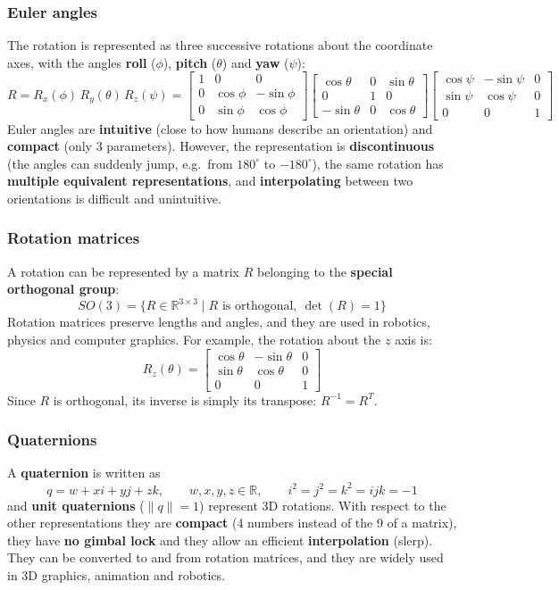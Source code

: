 \subsubsection{Euler angles}
The rotation is represented as three successive rotations about the coordinate axes, with the angles \textbf{roll} ($\phi$), \textbf{pitch} ($\theta$) and \textbf{yaw} ($\psi$):
\[
R = R_x(\phi)\,R_y(\theta)\,R_z(\psi) =
\begin{bmatrix} 1 & 0 & 0 \\ 0 & \cos\phi & -\sin\phi \\ 0 & \sin\phi & \cos\phi \end{bmatrix}
\begin{bmatrix} \cos\theta & 0 & \sin\theta \\ 0 & 1 & 0 \\ -\sin\theta & 0 & \cos\theta \end{bmatrix}
\begin{bmatrix} \cos\psi & -\sin\psi & 0 \\ \sin\psi & \cos\psi & 0 \\ 0 & 0 & 1 \end{bmatrix}
\]
Euler angles are \textbf{intuitive} (close to how humans describe an orientation) and \textbf{compact} (only 3 parameters).
However, the representation is \textbf{discontinuous} (the angles can suddenly jump, e.g.\ from $180^\circ$ to $-180^\circ$), the same rotation has \textbf{multiple equivalent representations}, and \textbf{interpolating} between two orientations is difficult and unintuitive.

\subsubsection{Rotation matrices}
A rotation can be represented by a matrix $R$ belonging to the \textbf{special orthogonal group}:
\[
SO(3) = \{ R \in \mathbb{R}^{3\times3} \mid R \text{ is orthogonal},\ \det(R) = 1 \}
\]
Rotation matrices preserve lengths and angles, and they are used in robotics, physics and computer graphics.
For example, the rotation about the $z$ axis is:
\[
R_z(\theta) = \begin{bmatrix} \cos\theta & -\sin\theta & 0 \\ \sin\theta & \cos\theta & 0 \\ 0 & 0 & 1 \end{bmatrix}
\]
Since $R$ is orthogonal, its inverse is simply its transpose: $R^{-1} = R^T$.

\subsubsection{Quaternions}
A \textbf{quaternion} is written as
\[
q = w + xi + yj + zk, \qquad w, x, y, z \in \mathbb{R}, \qquad i^2 = j^2 = k^2 = ijk = -1
\]
and \textbf{unit quaternions} ($\|q\| = 1$) represent 3D rotations.
With respect to the other representations they are \textbf{compact} (4 numbers instead of the 9 of a matrix), they have \textbf{no gimbal lock} and they allow an efficient \textbf{interpolation} (slerp). They can be converted to and from rotation matrices, and they are widely used in 3D graphics, animation and robotics.

